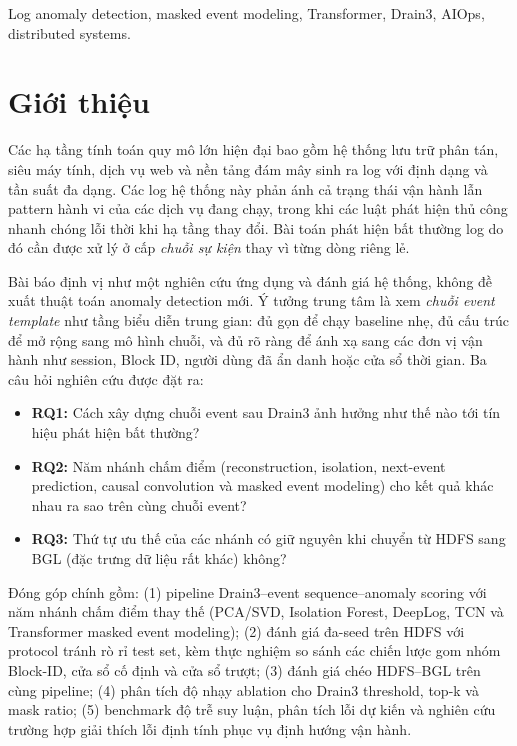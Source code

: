 \documentclass[conference]{IEEEtran}
\begin{document}
\begin{IEEEkeywords}
Log anomaly detection, masked event modeling, Transformer, Drain3, AIOps, distributed systems.
\end{IEEEkeywords}

\section{Giới thiệu}
Các hạ tầng tính toán quy mô lớn hiện đại bao gồm hệ thống lưu trữ phân tán, siêu máy tính, dịch vụ web và nền tảng đám mây sinh ra log với định dạng và tần suất đa dạng. Các log hệ thống này phản ánh cả trạng thái vận hành lẫn pattern hành vi của các dịch vụ đang chạy, trong khi các luật phát hiện thủ công nhanh chóng lỗi thời khi hạ tầng thay đổi. Bài toán phát hiện bất thường log do đó cần được xử lý ở cấp \emph{chuỗi sự kiện} thay vì từng dòng riêng lẻ.

Bài báo định vị như một nghiên cứu ứng dụng và đánh giá hệ thống, không đề xuất thuật toán anomaly detection mới. Ý tưởng trung tâm là xem \textit{chuỗi event template} như tầng biểu diễn trung gian: đủ gọn để chạy baseline nhẹ, đủ cấu trúc để mở rộng sang mô hình chuỗi, và đủ rõ ràng để ánh xạ sang các đơn vị vận hành như session, Block ID, người dùng đã ẩn danh hoặc cửa sổ thời gian. Ba câu hỏi nghiên cứu được đặt ra:
\begin{itemize}
    \item \textbf{RQ1:} Cách xây dựng chuỗi event sau Drain3 ảnh hưởng như thế nào tới tín hiệu phát hiện bất thường?
    \item \textbf{RQ2:} Năm nhánh chấm điểm (reconstruction, isolation, next-event prediction, causal convolution và masked event modeling) cho kết quả khác nhau ra sao trên cùng chuỗi event?
    \item \textbf{RQ3:} Thứ tự ưu thế của các nhánh có giữ nguyên khi chuyển từ HDFS sang BGL (đặc trưng dữ liệu rất khác) không?
\end{itemize}

Đóng góp chính gồm: (1) pipeline Drain3--event sequence--anomaly scoring với năm nhánh chấm điểm thay thế (PCA/SVD, Isolation Forest, DeepLog, TCN và Transformer masked event modeling); (2) đánh giá đa-seed trên HDFS với protocol tránh rò rỉ test set, kèm thực nghiệm so sánh các chiến lược gom nhóm Block-ID, cửa sổ cố định và cửa sổ trượt; (3) đánh giá chéo HDFS--BGL trên cùng pipeline; (4) phân tích độ nhạy ablation cho Drain3 threshold, top-k và mask ratio; (5) benchmark độ trễ suy luận, phân tích lỗi dự kiến và nghiên cứu trường hợp giải thích lỗi định tính phục vụ định hướng vận hành.
\end{document}
